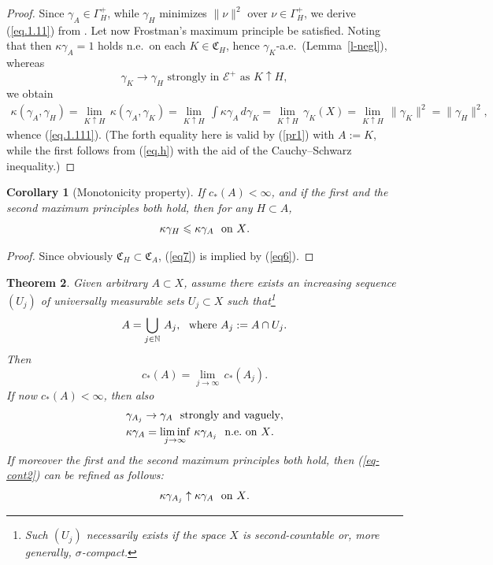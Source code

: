 \documentclass[12pt,a4paper,reqno]{amsart} %
\theoremstyle{lause}
\theoremstyle{maaritelma}
\theoremstyle{lause}
\newtheorem{theorem}{Theorem}[section]
\newtheorem{corollary}[theorem]{Corollary}
\theoremstyle{maaritelma}
\numberwithin{equation}{section}
\begin{document}
\begin{proof}Since $\gamma_A\in\Gamma_H^+$, while $\gamma_H$ minimizes $\|\nu\|^2$ over $\nu\in\Gamma_H^+$, we derive (\ref{eq.1.11}) from \cite[Lemma~4.1.1]{F1}.
Let now Frostman's maximum principle be satisfied. Noting that then $\kappa\gamma_A=1$ holds n.e.\ on each $K\in\mathfrak C_H$, hence $\gamma_K$-a.e.\ (Lemma~\ref{l-negl}), whereas
\begin{equation}\label{eq.h}
\gamma_K\to\gamma_H\text{ \ strongly in $\mathcal E^+$ as $K\uparrow H$},\end{equation}
we obtain
\begin{align*}\kappa(\gamma_A,\gamma_H)=\lim_{K\uparrow H}\,\kappa(\gamma_A,\gamma_K)=\lim_{K\uparrow H}\,\int\kappa\gamma_A\,d\gamma_K=\lim_{K\uparrow H}\,\gamma_K(X)=\lim_{K\uparrow H}\,\|\gamma_K\|^2=\|\gamma_H\|^2,\end{align*}
whence (\ref{eq.1.111}). (The forth equality here is valid by (\ref{pr1}) with $A:=K$, while the first follows from (\ref{eq.h}) with the aid of the Cauchy--Schwarz inequality.)\end{proof}

\begin{corollary}[{\rm Monotonicity property}]\label{eq-mon} If\/ $c_*(A)<\infty$, and if the first and the second maximum principles both hold, then for any\/ $H\subset A$,
\begin{equation}\label{eq7}\kappa\gamma_H\leqslant\kappa\gamma_A\text{ \ on\/ $X$}.\end{equation}
\end{corollary}

\begin{proof}Since obviously $\mathfrak C_H\subset\mathfrak C_A$, (\ref{eq7}) is implied by (\ref{eq6}).\end{proof}

\begin{theorem}\label{th-cont2}Given arbitrary\/ $A\subset X$, assume there exists an increasing sequence\/ $(U_j)$ of universally measurable sets\/ $U_j\subset X$ such that\/\footnote{Such $(U_j)$ necessarily exists if the space $X$ is second-countable or, more generally, $\sigma$-com\-pact.}
\[A=\bigcup_{j\in\mathbb N}\,A_j,\text{ \ where\/ $A_j:=A\cap U_j$.}\]
Then
\begin{equation}\label{eq-cont}c_*(A)=\lim_{j\to\infty}\,c_*(A_j).\end{equation}
If now\/ $c_*(A)<\infty$, then also
\begin{align}&\gamma_{A_j}\to\gamma_A\text{ \ strongly and vaguely},\label{eq-cont1}\\
&\kappa\gamma_A=\liminf_{j\to\infty}\,\kappa\gamma_{A_j}\text{ \ n.e.\ on\/ $X$.}\label{eq-cont2}
\end{align}
If moreover the first and the second maximum principles both hold,
then\/ {\rm(\ref{eq-cont2})} can be refined as follows:
\begin{equation}\label{eq-cont3}\kappa\gamma_{A_j}\uparrow\kappa\gamma_A\text{ \ on\/ $X$.}\end{equation}
\end{theorem}
\end{document}
